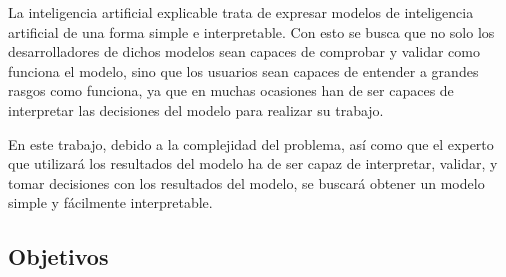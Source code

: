La inteligencia artificial explicable trata de expresar modelos de inteligencia artificial de una forma simple e interpretable. Con esto se busca que no solo los desarrolladores de dichos modelos sean capaces de comprobar y validar como funciona el modelo, sino que los usuarios sean capaces de entender a grandes rasgos como funciona, ya que en muchas ocasiones han de ser capaces de interpretar las decisiones del modelo para realizar su trabajo.

En este trabajo, debido a la complejidad del problema, así como que el experto que utilizará los resultados del modelo ha de ser capaz de interpretar, validar, y tomar decisiones con los resultados del modelo, se buscará obtener un modelo simple y fácilmente interpretable.


\subsection{Objetivos}
